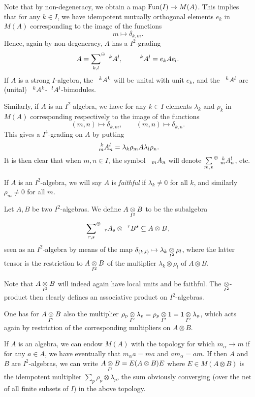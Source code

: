 Note that by non-degeneracy, we obtain a map $\Fun(I)\rightarrow
M(A)$. This implies that for any $k\in I$, we have idempotent mutually
orthogonal elements $e_k$ in $M(A)$ corresponding to the image of the
functions \[m \mapsto \delta_{k,m}.\] Hence, again by non-degeneracy,
$A$ has a $I^{2}$-grading \[ A = \osum{k,l}\Gru{A}{k}{l}, \qquad
\Gru{A}{k}{l} = e_kAe_l.\] If $A$ is a strong $I$-algebra, the
$\Gru{A}{k}{k}$ will be unital with unit $e_k$, and the
$\Gru{A}{k}{l}$ are (unital)
$\Gru{A}{k}{k}$-$\Gru{A}{l}{l}$-bimodules.

Similarly, if $A$ is an $I^2$-algebra, we have for any $k\in I$
elements $\lambda_k$ and $\rho_k$ in $M(A)$ corresponding respectively
to the image of the functions \[(m,n) \mapsto \delta_{k,m},\qquad
(m,n)\mapsto \delta_{k,n}.\] This gives a $I^4$-grading on $A$ by
putting \[\Gr{A}{k}{l}{m}{n} = \lambda_k\rho_mA\lambda_l\rho_n.\] It
is then clear that when $m,n\in I$, the symbol $\Grd{A}{m}{n}$ will
denote $\osum{m,n} \Gr{A}{k}{l}{m}{n}$, etc.

\begin{Def} If $A$ is an $I^2$-algebra, we will say $A$ is
  \emph{faithful} if $\lambda_k\neq 0$ for all $k$, and similarly
  $\rho_m\neq 0$ for all $m$.\end{Def}

\begin{Def} Let $A,B$ be two $I^2$-algebras. We define $A\itimes B$ to
  be the subalgebra \[\osum{r,s} \Grd{A}{r}{s}\otimes \Gru{B}{r}{s}
  \subseteq A\otimes B,\] seen as an $I^2$-algebra by means of the map
  $\delta_{(k,l)}\mapsto \lambda_k\itimes \rho_l$, where the latter
  tensor is the restriction to $A\itimes B$ of the multiplier
  $\lambda_k\otimes \rho_l$ of $A\otimes B$.
\end{Def}

\begin{Rem} Note that $A\itimes B$ will indeed again have local units
  and be faithful. The $\itimes$-product then clearly defines an
  associative product on $I^2$-algebras.
\end{Rem}

\begin{Rem} One has for $A\itimes B$ also the multiplier
  $\rho_p\itimes \lambda_p = \rho_p\itimes 1 = 1\itimes \lambda_p$,
  which acts again by restriction of the corresponding multipliers on
  $A\otimes B$.
\end{Rem}

\begin{Rem}\label{RemCut} If $A$ is an algebra, we can endow $M(A)$
  with the topology for which $m_{\alpha}\rightarrow m$ if for any
  $a\in A$, we have eventually that $m_{\alpha}a=ma$ and
  $am_{\alpha}=am$. If then $A$ and $B$ are $I^2$-algebras, we can
  write $A\itimes B = E(A\otimes B)E$ where $E \in M(A\otimes B)$ is
  the idempotent multiplier $\sum_{p}\rho_p\otimes \lambda_p$, the sum
  obviously converging (over the net of all finite subsets of $I$) in
  the above topology.
\end{Rem}


